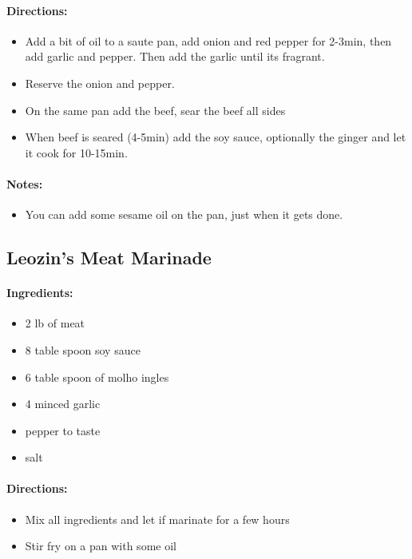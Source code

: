 \documentclass{article}
\begin{document}
\paragraph{Directions:}
\begin{itemize}
    \item Add a bit of oil to a saute pan, add onion and red pepper for 2-3min, then add garlic and pepper. Then add the garlic until its fragrant.
    \item Reserve the onion and pepper.
    \item On the same pan add the beef, sear the beef all sides
    \item When beef is seared (4-5min) add the soy sauce, optionally the ginger and let it cook for 10-15min.
\end{itemize}

\paragraph{Notes:}
\begin{itemize}
    \item You can add some sesame oil on the pan, just when it gets done.
\end{itemize}

\subsection{Leozin’s Meat Marinade}

\paragraph{Ingredients:}
\begin{itemize}
    \item 2 lb of meat
    \item 8 table spoon soy sauce
    \item 6 table spoon of molho ingles
    \item 4 minced garlic
    \item pepper to taste
    \item salt
\end{itemize}

\paragraph{Directions:}
\begin{itemize}
    \item Mix all ingredients and let if marinate for a few hours
    \item Stir fry on a pan with some oil
\end{itemize}
\end{document}
